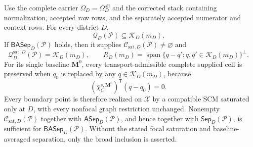 Use the complete carrier \(\Omega_D=\Omega_D^{\mathrm{all}}\) and the corrected stack containing normalization, accepted raw rows, and the separately accepted numerator and context rows.  For every district \(D\),
\[
\mathcal Q_D(\mathcal P)\subseteq\mathcal K_D(m_D).
\]
If \(\mathsf{BASep}_D(\mathcal P)\) holds, then it supplies \(\mathcal C_{\mathrm{sat},D}(\mathcal P)\ne\varnothing\) and
\[
\mathcal Q_D^{\mathrm{sat},D}(\mathcal P)=\mathcal K_D(m_D),\qquad
R_D(m_D)=\operatorname{span}\{q-q':q,q'\in\mathcal K_D(m_D)\}^{\perp}.
\]
For its single baseline \(\mathbf M^0\), every transport-admissible complete supplied cell is preserved when \(q_0\) is replaced by any \(q\in\mathcal K_D(m_D)\), because
\[
(\bar\chi_C^{s,\mathbf M^0})^{\mathsf T}(q-q_0)=0.
\]
Every boundary point is therefore realized on \(\mathcal X\) by a compatible SCM saturated only at \(D\), with every nonfocal graph restriction unchanged.  Nonempty \(\mathcal C_{\mathrm{sat},D}(\mathcal P)\) together with \(\mathsf{ASep}_D(\mathcal P)\), and hence together with \(\mathsf{Sep}_D(\mathcal P)\), is sufficient for \(\mathsf{BASep}_D(\mathcal P)\).  Without the stated focal saturation and baseline-averaged separation, only the broad inclusion is asserted.